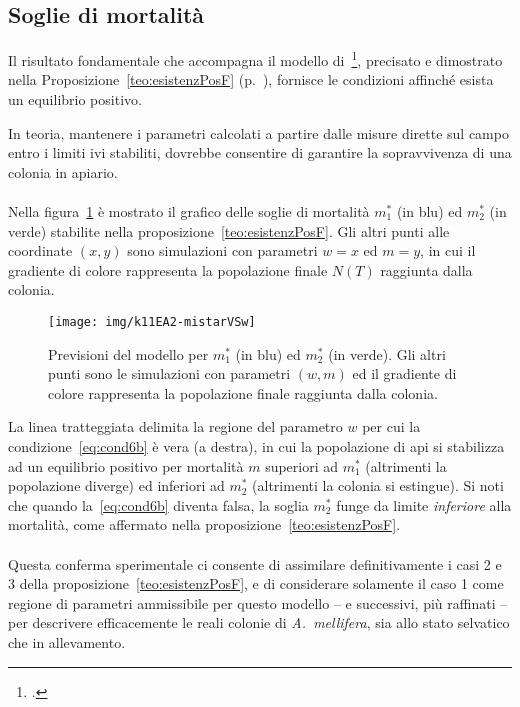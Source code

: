 \subsection{Soglie di mortalità}
\label{ssec:simSoglie}
Il risultato fondamentale che accompagna il modello di~\citeauthor{khoury2011}\footcite{khoury2011},
precisato e dimostrato nella
Proposizione~\ref{teo:esistenzPosF} (p.~\pageref{teo:esistenzPosF}), fornisce le condizioni affinché esista un
equilibrio positivo.

In teoria, mantenere i parametri calcolati a partire dalle misure dirette sul campo
entro i limiti ivi stabiliti, dovrebbe consentire di garantire la sopravvivenza di una colonia in apiario.

\paragraph{}
Nella figura~\ref{img:kh11expA24} è mostrato il grafico delle soglie di mortalità $m_1^*$ (in blu) ed
$m_2^*$ (in verde) stabilite nella proposizione~\ref{teo:esistenzPosF}.
Gli altri punti alle coordinate $(x,y)$ sono simulazioni con parametri $w=x$ ed $m=y$, in cui il gradiente
di colore rappresenta la popolazione finale $N(T)$ raggiunta dalla colonia.

\begin{figure}[!h]
    \centering
    \texttt{[image: img/k11EA2-mistarVSw]}

    \caption[Esperimento A2, soglie di mortalità]{Previsioni del modello per $m_1^*$ (in blu) ed $m_2^*$ (in verde).
        Gli altri punti sono le simulazioni con parametri $(w,m)$ ed il gradiente di colore rappresenta la popolazione
        finale raggiunta dalla colonia.
    }

    \label{img:kh11expA24}
\end{figure}

La linea tratteggiata delimita la regione del parametro $w$ per cui la condizione~\eqref{eq:cond6b} è vera (a destra),
in cui la popolazione di api si stabilizza ad un equilibrio positivo per mortalità $m$ superiori ad $m_1^*$
(altrimenti la popolazione diverge) ed inferiori ad $m_2^*$ (altrimenti la colonia si estingue).
Si noti che quando la~\eqref{eq:cond6b} diventa falsa, la soglia $m_2^*$ funge
da limite \emph{inferiore} alla mortalità, come affermato nella proposizione~\ref{teo:esistenzPosF}.

\paragraph{}
Questa conferma sperimentale ci consente di assimilare definitivamente i casi 2 e 3 della
proposizione~\ref{teo:esistenzPosF}, e di considerare solamente il caso 1 come regione di parametri ammissibile
per questo modello -- e successivi, più raffinati -- per descrivere efficacemente le reali colonie di \emph{A.~mellifera},
sia allo stato selvatico che in allevamento.
